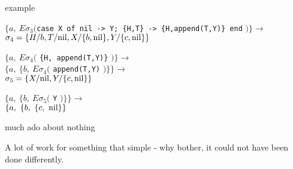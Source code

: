 \begin{frame}{example}

\begin{eval} 
\pause $\lbrace a,\ E\sigma_3(${\tt case X of nil -> Y; \{H,T\} -> \{H,append(T,Y)\} end} $)\rbrace \rightarrow$\\
\pause\hspace{10pt} $\sigma_4 = \lbrace H/b, T/{\rm nil}, X/\lbrace b, {\rm nil}\rbrace, Y/\lbrace c, {\rm nil}\rbrace \rbrace$\\ 
\end{eval}

\vspace{10pt}

\begin{eval} 
\pause $\lbrace a,\ E\sigma_4($ {\tt \{H, append(T,Y)\}} $) \rbrace \rightarrow$\\
\pause $\lbrace a,\ \lbrace b, \ E\sigma_4($ {\tt append(T,Y)} $)\rbrace \rbrace \rightarrow$\\
\pause\hspace{10pt} $\sigma_5 = \lbrace X/{\rm nil}, Y/\lbrace c, {\rm nil}\rbrace \rbrace$\\ 
\end{eval}

\vspace{10pt}

\begin{eval} 
\pause $\lbrace a,\ \lbrace b, \ E\sigma_5($ {\tt Y} $)\rbrace \rbrace \rightarrow$\\
\pause $\lbrace a,\ \lbrace b, \ \lbrace c, \ {\rm nil}\rbrace\rbrace$\\
\end{eval}

\end{frame}


\begin{frame}{much ado about nothing}

A lot of work for something that simple - why bother, it could not have
been done differently.
\end{frame}



